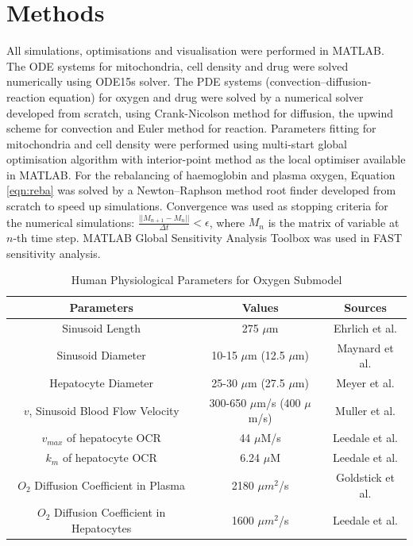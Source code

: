 \documentclass[12pt]{article}
\begin{document}
\section{Methods}
All simulations, optimisations and visualisation were performed in MATLAB. The ODE systems for mitochondria, cell density and drug were solved numerically using ODE15s solver. The PDE systems (convection–diffusion-reaction equation) for oxygen and drug were solved by a numerical solver developed from scratch, using Crank-Nicolson method for diffusion, the upwind scheme for convection and Euler method for reaction. Parameters fitting for mitochondria and cell density were performed using multi-start global optimisation algorithm with interior-point method as the local optimiser available in MATLAB. For the rebalancing of haemoglobin and plasma oxygen, Equation \ref{eqn:reba} was solved by a Newton–Raphson method root finder developed from scratch to speed up simulations. Convergence was used as stopping criteria for the numerical simulations: $\frac{||M_{n+1}-M_n||}{\Delta t}<\epsilon$, where $M_n$ is the matrix of variable at $n$-th time step. MATLAB Global Sensitivity Analysis Toolbox was used in FAST sensitivity analysis.
\begin{table}
\centering
\begin{tabular}{|c | c| c|} 
 \hline
 \textbf{Parameters} & \textbf{Values} & \textbf{Sources}\\
 \hline\hline
 Sinusoid Length & 275 $\mu$m & Ehrlich et al. \cite{ehrlichChallengesOpportunitiesDesign2019}\\ 
 \hline
Sinusoid Diameter & 10-15 $\mu$m (12.5 $\mu$m) & Maynard et al. \cite{maynardChapter14Liver2019}\\
\hline
Hepatocyte Diameter & 25-30 $\mu$m (27.5 $\mu$m) & Meyer et al. \cite{meyerChapterLiver2016}\\
\hline
$v$, Sinusoid Blood Flow Velocity & 300-650 $\mu$m/s (400 $\mu$m/s) & Muller et al.\cite{mullerEstimatingBloodFlow2009}\\
\hline
$v_{max}$ of hepatocyte OCR & 44 $\mu$M/s & Leedale et al. \cite{leedaleMultiscaleModellingDrug2020}\\
\hline
$k_m$ of hepatocyte OCR & 6.24 $\mu$M & Leedale et al. \cite{leedaleMultiscaleModellingDrug2020}\\
\hline
$O_2$ Diffusion Coefficient in Plasma & 2180 $\mu m^2$/s & Goldstick et al. \cite{goldstickDiffusionOxygenPlasma1976}\\
\hline
 $O_2$ Diffusion Coefficient in Hepatocytes & 1600 $\mu m^2$/s & Leedale et al. \cite{leedaleMultiscaleModellingDrug2020}\\
\hline

\end{tabular}
\caption{Human Physiological Parameters for Oxygen Submodel}
\label{Tab:2}
\end{table}
\end{document}
